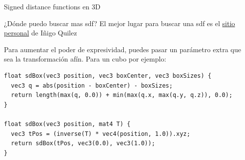 \begin{frame}[fragile]{Signed distance functions en 3D}
\begin{block}{¿Dónde puedo buscar mas sdf?}
    El mejor lugar para buscar una sdf es el \href{https://iquilezles.org/articles/distfunctions/}{sitio personal} de Iñigo Quilez
\end{block}
Para aumentar el poder de expresividad, puedes pasar un parámetro extra que sea la transformación afín.
Para un cubo por ejemplo:
\begin{listing}
\begin{verbatim}
float sdBox(vec3 position, vec3 boxCenter, vec3 boxSizes) {
  vec3 q = abs(position - boxCenter) - boxSizes;
  return length(max(q, 0.0)) + min(max(q.x, max(q.y, q.z)), 0.0);
}

float sdBox(vec3 position, mat4 T) {
  vec3 tPos = (inverse(T) * vec4(position, 1.0)).xyz;
  return sdBox(tPos, vec3(0.0), vec3(1.0));
}
\end{verbatim}
\end{listing}

\end{frame}

